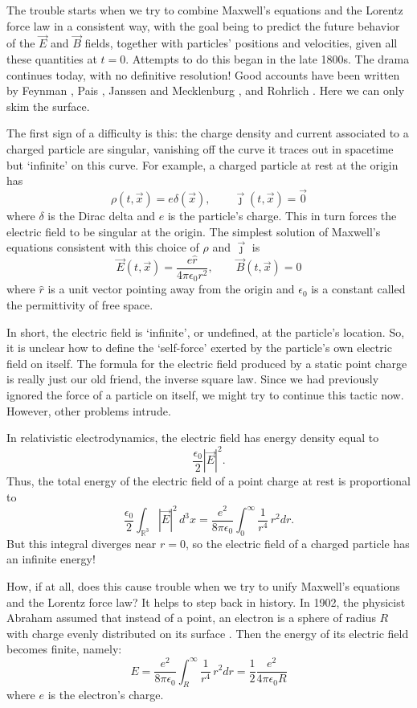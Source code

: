 \documentclass{article}
\begin{document}
The trouble starts when we try to combine Maxwell's equations and the Lorentz force law in a consistent way, with the goal being to predict the future behavior of the $\vec{E}$ and $\vec{B}$ fields, together with particles' positions and velocities, given all these quantities at $t = 0$.  Attempts to do this began in the late 1800s.  The drama continues today, with no definitive resolution!   Good accounts have been written by Feynman \cite{Feynman}, Pais \cite{Pais}, Janssen and Mecklenburg \cite{JM}, and Rohrlich \cite{Rohrlich1997}.  Here we can only skim the surface.

The first sign of a difficulty is this: the charge density and current associated to a charged particle are singular, vanishing off the curve it traces out in spacetime but `infinite' on this curve.  For example, a charged particle at rest at the origin has
\[        \rho(t,\vec x) = e \delta(\vec{x}), \qquad \vec{\jmath}(t,\vec{x}) = \vec{0} \]
where $\delta$ is the Dirac delta and $e$ is the particle's charge.   
This in turn forces the electric field to be singular at the origin.  The simplest solution of Maxwell's equations consistent with this choice of $\rho$ and $\vec\jmath$ is
\[  \vec{E}(t,\vec x) = \frac{e \hat{r}}{4 \pi \epsilon_0 r^2}, \qquad 
     \vec{B}(t,\vec x) = 0 \]
where $\hat{r}$ is a unit vector pointing away from the origin and $\epsilon_0$ is a constant called the permittivity of free space.  

In short, the electric field is `infinite', or undefined, at the particle's location.  So, it is unclear how to define the `self-force' exerted by the particle's own electric field on itself.
The formula for the electric field produced by a static point charge is really just our old friend, the inverse square law.  Since we had previously ignored the force of a particle 
on itself, we might try to continue this tactic now.   However, other problems intrude.

In relativistic electrodynamics, the electric field has energy density equal to 
\[         \frac{\epsilon_0}{2} |\vec{E}|^2 .   \]
Thus, the total energy of the electric field of a point charge at rest is proportional to
\[  \displaystyle{ \frac{\epsilon_0}{2} \int_{\mathbb{R}^3} |\vec{E}|^2 \, d^3 x =
\frac{e^2}{8 \pi \epsilon_0} \int_0^\infty \frac{1}{r^4} \, r^2 dr. } \]
But this integral diverges near $r = 0$, so the electric field of a charged particle 
has an infinite energy!   

How, if at all, does this cause trouble when we try to unify Maxwell's equations and the Lorentz force law?  It helps to step back in history.  In 1902, the physicist Abraham assumed that instead of a point, an electron is a sphere of radius $R$ with charge evenly distributed on its surface \cite{Abraham1902}. Then the energy of its electric field becomes finite, namely:
\[  E = \frac{e^2}{8 \pi \epsilon_0} \int_{R}^\infty \frac{1}{r^4} \, r^2 dr 
= \frac{1}{2} \frac{e^2}{4 \pi \epsilon_0 R} \]
where $e$ is the electron's charge. 
\end{document}
